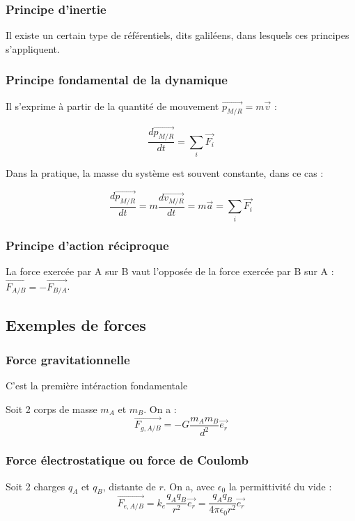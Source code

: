 \documentclass[french]{yLectureNote}
\renewcommand{\vec}{\overrightarrow}
\begin{document}
\subsubsection{Principe d'inertie}
Il existe un certain type de référentiels, dits galiléens, dans lesquels ces principes s'appliquent.
\subsubsection{Principe fondamental de la dynamique}
Il s'exprime à partir de la quantité de mouvement $\vec{p_{M/R}} = m\vec{v}$ :

\begin{theorem}[Relation]
\[\frac{d\vec{p_{M/R}}}{dt} = \sum_i \vec{F_i}\]
\end{theorem}

Dans la pratique, la masse du système est souvent constante, dans ce cas :

\begin{theorem}[Relation]
\[\frac{d\vec{p_{M/R}}}{dt} = m\frac{d\vec{v_{M/R}}}{dt} =  m\vec{a} = \sum_i \vec{F_i}\]
\end{theorem}
\subsubsection{Principe d'action réciproque}
La force exercée par A sur B vaut l'opposée de la force exercée par B sur A : $\vec{F_{A/B}} = - \vec{F_{B/A}}$.
\subsection{Exemples de forces}
\subsubsection{Force gravitationnelle}
C'est la première intéraction fondamentale

Soit 2 corps de masse $m_A$ et $m_B$. On a :
\[\vec{F_{g,A/B}} = -G\frac{m_Am_B}{d^2} \vec{e_r}\]

\subsubsection{Force électrostatique ou force de Coulomb}

Soit 2 charges $q_A$ et $q_B$, distante de $r$. On a, avec $\epsilon_0$ la permittivité du vide :
\[\vec{F_{e,A/B}} = k_e\frac{q_Aq_B}{r^2} \vec{e_r} = \frac{q_Aq_B}{4\pi \epsilon_0r^2} \vec{e_r}\]
\end{document}
